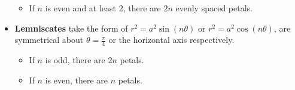 \documentclass[../AP_Calculus]{subfiles}
\begin{document}
\begin{itemize}
\begin{itemize}
						\item If $n$ is even and at least 2, there are $2n$ evenly spaced petals.
							\begin{center}
							\end{center}
					\end{itemize}
				\item \textbf{Lemniscates} take the form of $r^2 = a^2\sin(n\theta)$ or $r^2 = a^2\cos(n\theta)$, are symmetrical about $\theta = \frac{\pi}{4}$ or the horizontal axis respectively.
					\begin{itemize}
						\item If $n$ is odd, there are $2n$ petals.
							\begin{center}
							\end{center}
						\item If $n$ is even, there are $n$ petals.
							\begin{center}
							\end{center}
					\end{itemize}
			\end{itemize}
\end{document}
